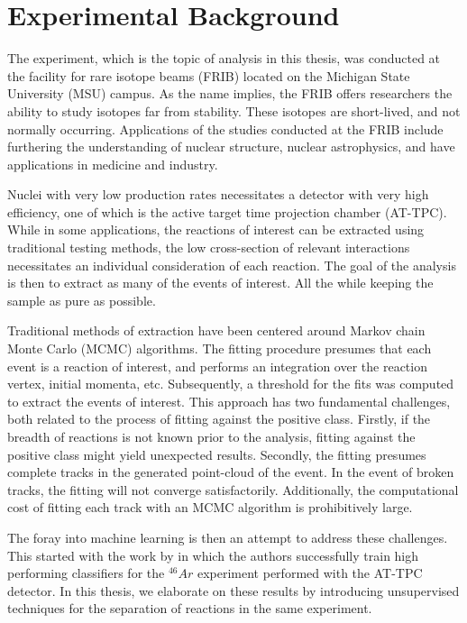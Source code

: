 \chapter{Experimental Background}\label{ch:experimental}

The experiment, which is the topic of analysis in this thesis, was conducted at the facility for rare isotope beams (FRIB) located on the Michigan State University (MSU) campus. As the name implies, the FRIB offers researchers the ability to study isotopes far from stability. These isotopes are short-lived, and not normally occurring. Applications of the studies conducted at the FRIB include furthering the understanding of nuclear structure, nuclear astrophysics, and have applications in medicine and industry. 

Nuclei with very low production rates necessitates a detector with very high efficiency, one of which is the active target time projection chamber (AT-TPC). While in some applications, the reactions of interest can be extracted using traditional testing methods, the low cross-section of relevant interactions necessitates an individual consideration of each reaction. The goal of the analysis is then to extract as many of the events of interest. All the while keeping the sample as pure as possible. 

Traditional methods of extraction have been centered around Markov chain Monte Carlo (MCMC) algorithms. The fitting procedure presumes that each event is a reaction of interest, and performs an integration over the reaction vertex, initial momenta, etc. Subsequently, a threshold for the fits was computed to extract the events of interest. This approach has two fundamental challenges, both related to the process of fitting against the positive class. Firstly, if the breadth of reactions is not known prior to the analysis, fitting against the positive class might yield unexpected results. Secondly, the fitting presumes complete tracks in the generated point-cloud of the event. In the event of broken tracks, the fitting will not converge satisfactorily. Additionally, the computational cost of fitting each track with an MCMC algorithm is prohibitively large. 

The foray into machine learning is then an attempt to address these challenges. This started with the work by \cite{Kuchera2019} in which the authors successfully train high performing classifiers for the ${}^{46}Ar$ experiment performed with the AT-TPC detector. In this thesis, we elaborate on these results by introducing unsupervised techniques for the separation of reactions in the same experiment.